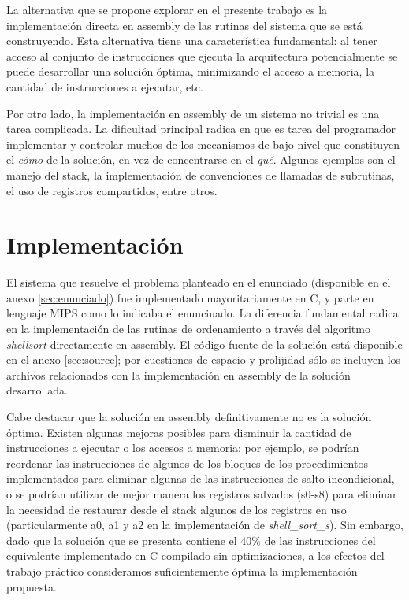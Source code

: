 \documentclass[a4paper,11pt]{article}
\begin{document}
La alternativa que se propone explorar en el presente trabajo es la
implementación directa en assembly de las rutinas del sistema que se está
construyendo. Esta alternativa tiene una característica fundamental: al tener
acceso al conjunto de instrucciones que ejecuta la arquitectura potencialmente
se puede desarrollar una solución óptima, minimizando el acceso a memoria, la
cantidad de instrucciones a ejecutar, etc.

Por otro lado, la implementación en assembly de un sistema no trivial es una
tarea complicada. La dificultad principal radica en que es tarea del
programador implementar y controlar muchos de los mecanismos de bajo nivel que
constituyen el \textit{cómo} de la solución, en vez de concentrarse en el
\textit{qué}. Algunos ejemplos son el manejo del stack, la implementación de
convenciones de llamadas de subrutinas, el uso de registros compartidos, entre
otros.

\section{Implementación}

El sistema que resuelve el problema planteado en el enunciado (disponible en el
anexo \ref{sec:enunciado}) fue implementado mayoritariamente en C, y parte en 
lenguaje MIPS como lo indicaba el enunciuado. La diferencia fundamental radica 
en la implementación de las rutinas de ordenamiento a través del algoritmo 
\textit{shellsort} directamente en assembly. El código fuente de
la solución está disponible en el anexo \ref{sec:source}; por cuestiones de
espacio y prolijidad sólo se incluyen los archivos relacionados con la
implementación en assembly de la solución desarrollada.

Cabe destacar que la solución en assembly definitivamente no es la solución
óptima. Existen algunas mejoras posibles para disminuir la cantidad de
instrucciones a ejecutar o los accesos a memoria: por ejemplo, se podrían
reordenar las instrucciones de algunos de los bloques de los procedimientos
implementados para eliminar algunas de las instrucciones de salto
incondicional, o se podrían utilizar de mejor manera los registros salvados
(s0-s8) para eliminar la necesidad de restaurar desde el stack algunos de los
registros en uso (particularmente a0, a1 y a2 en la implementación de
\textit{shell\_sort\_s}). Sin embargo, dado que la solución que se presenta
contiene el \(40\%\) de las instrucciones del equivalente implementado en C
compilado sin optimizaciones, a los efectos del trabajo práctico consideramos
suficientemente óptima la implementación propuesta.
\end{document}
